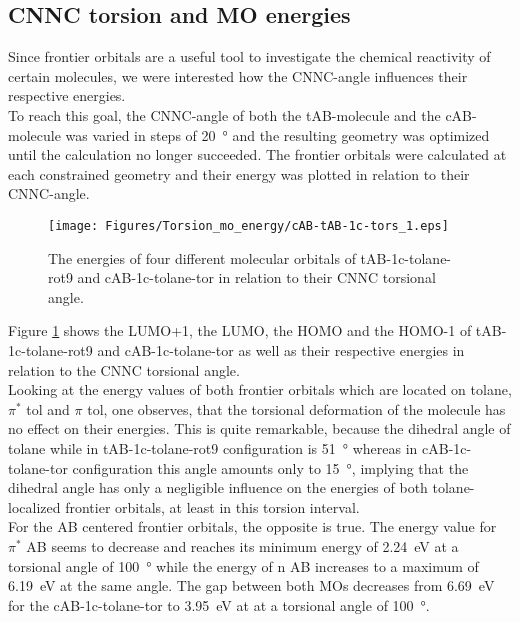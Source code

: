 \subsection{CNNC torsion and MO energies}
Since frontier orbitals are a useful tool to investigate the chemical reactivity of certain molecules, we were interested how the CNNC-angle influences their respective energies. \\
To reach this goal, the CNNC-angle of both the tAB-molecule and the cAB-molecule was varied in steps of \SI{20}{\degree} and the resulting geometry was optimized until the calculation no longer succeeded. The frontier orbitals were calculated at each constrained geometry and their energy was plotted in relation to their CNNC-angle.\\
%
\begin{figure}[H]
    \centering
    \texttt{[image: Figures/Torsion\_mo\_energy/cAB-tAB-1c-tors\_1.eps]}
    \caption{The energies of four different molecular orbitals of tAB-1c-tolane-rot9 and cAB-1c-tolane-tor in relation to their CNNC torsional angle.}
    \label{fig:MO_tors_1c_AB}
\end{figure}
%
Figure \ref{fig:MO_tors_1c_AB} shows the LUMO+1, the LUMO, the HOMO and the HOMO-1 of tAB-1c-tolane-rot9 and cAB-1c-tolane-tor as well as their respective energies in relation to the CNNC torsional angle. \\ 
Looking at the energy values of both frontier orbitals which are located on tolane, $\pi^*$ tol and $\pi$ tol, one observes, that the torsional deformation of the molecule has no effect on their energies. This is quite remarkable, because the dihedral angle of tolane while in tAB-1c-tolane-rot9 configuration is \SI{51}{\degree} whereas in cAB-1c-tolane-tor configuration this angle amounts only to \SI{15}{\degree}, implying that the dihedral angle has only a negligible influence on the energies of both tolane-localized frontier orbitals, at least in this torsion interval.\\
For the AB centered frontier orbitals, the opposite is true. The energy value for $\pi^*$ AB seems to decrease and reaches its minimum energy of \SI{2.24}{\eV} at a torsional angle of \SI{100}{\degree} while the energy of n AB increases to a maximum of \SI{6.19}{\eV} at the same angle. The gap between both MOs decreases from \SI{6.69}{\eV} for the cAB-1c-tolane-tor to \SI{3.95}{\eV} at at a torsional angle of \SI{100}{\degree}. 
